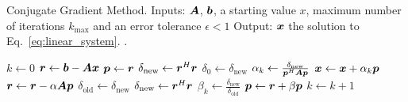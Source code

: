 \documentclass[useAMS,usenatbib]{mn2e}
\newcommand{\bA}{\bmath{A}}
\newcommand{\br}{\bmath{r}}
\newcommand{\bb}{\bmath{b}}
\newcommand{\bx}{\bmath{x}}
\newcommand{\bp}{\bmath{p}}
\begin{document}

\begin{algorithm}
\caption{Conjugate Gradient Method. Inputs: $\bA$, $\bb$, a starting value $x$, maximum number of iterations $k_{\textrm{max}}$ and an error tolerance $\epsilon<1$ Output: $\bx$ the solution to Eq.~\eqref{eq:linear_system}. \citep{Shewchuk1994}.}\label{algo:CG}
\begin{algorithmic}[1]
\State $k \gets 0$
\State $\br \gets \bb - \bA\bx$
\State $\bp \gets \br$
\State $\delta_{\textrm{new}} \gets \br^H\br$
\State $\delta_0 \gets \delta_{\textrm{new}}$
\State $\alpha_k \gets \frac{\delta_{\textrm{new}}}{\bp^H\bA\bp}$
\State $\bx \gets \bx + \alpha_k\bp$
\State $\br \gets \br - \alpha\bA\bp$
\State $\delta_{\textrm{old}} \gets \delta_{\textrm{new}}$ 
\State $\delta_{\textrm{new}} \gets \br^H\br$
\State $\beta_{k} \gets \frac{\delta_{\textrm{new}}}{\delta_{\textrm{old}}}$
\State $\bp \gets \br + \beta\bp$
\State $k \gets k + 1$
\EndWhile
\end{algorithmic}
\end{algorithm}
\end{document}

